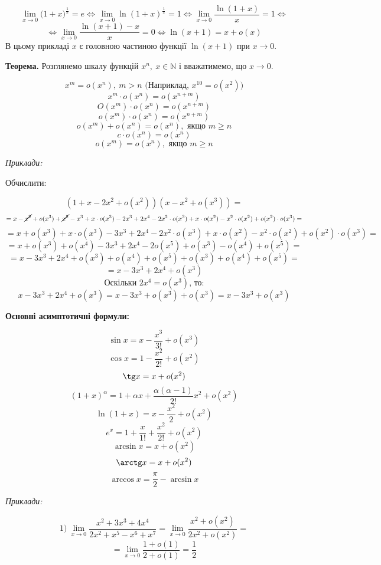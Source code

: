 \documentclass[12pt]{report}
\begin{document}
$$\lim_{x\to 0 }\Big( 1 + x \Big)^{\frac{1}{x}} = e \Longleftrightarrow \lim_{x\to 0} \ln (1 + x)^{\frac{1}{x}} = 1 \Longleftrightarrow \lim_{x\to 0} \frac{\ln (1+x)}{x} = 1 \Longleftrightarrow $$ 
$$\Longleftrightarrow \lim_{x \to 0} \frac{\ln(x+1) - x}{x} = 0 \Longleftrightarrow \ln(x+1) = x + o(x)$$
В цьому прикладі $x$ є головною частиною функції $\ln(x+1)$ при $x \to 0$.

\vspace{5mm}

\textbf{Теорема.} Розглянемо шкалу функцій $x^n, \ x \in \mathbb{N}$ і вважатимемо, що $x \to 0$.

$$x^m = o(x^n), \ m > n \textrm{ (Наприклад, $x^{10} = o(x^2)$)}$$
$$x^m \cdot o(x^n) = o(x^{n+m})$$
$$O(x^m)\cdot o(x^n) = o(x^{n+m})$$
$$o(x^m)\cdot o(x^n) = o(x^{n+m})$$
$$o(x^m) + o(x^n) = o(x^n), \textrm{ якщо $m \geq n$}$$
$$c\cdot o(x^n) = o(x^n)$$
$$o(x^m) = o(x^n), \textrm{ якщо $m \geq n$}$$

\textit{Приклади:}

\vspace{3mm}

Обчислити:

$$(1 + x - 2x^2 + o(x^2))(x - x^2 + o(x^3)) = $$
$$=x - \cancel{x^2} + o(x^3) + \cancel{x^2} - x^3 + x \cdot o(x^3) - 2x^3 + 2x^4 - 2x^2\cdot o(x^3) + x\cdot o(x^2) - x^2 \cdot o(x^2) + o(x^2) \cdot o(x^3) = $$
$$=x + o(x^3) + x \cdot o(x^3) - 3x^3 + 2x^4 - 2x^2\cdot o(x^3) + x\cdot o(x^2) - x^2 \cdot o(x^2) + o(x^2) \cdot o(x^3) = $$
$$=x + o(x^3) + o(x^4) - 3x^3 + 2x^4 - 2o(x^5) + o(x^3) - o(x^4) + o(x^5) = $$
$$=x - 3x^3 + 2x^4 + o(x^3) + o(x^4) + o(x^5) + o(x^3) + o(x^4) + o(x^5) = $$
$$=x - 3x^3 + 2x^4 + o(x^3)$$
$$\textrm{Оскільки $2x^4 = o(x^3)$, то:}$$
$$x - 3x^3 + 2x^4 + o(x^3) = x - 3x^3 + o(x^3) + o(x^3) = x - 3x^3 + o(x^3)$$

\textbf{Основні асимптотичні формули:}

$$\sin x = x - \frac{x^3}{3!} + o(x^3)$$
$$\cos x = 1 - \frac{x^2}{2!} + o(x^2)$$
$$\tg x = x + o(x^2)$$
$$(1+x)^{\alpha} = 1 + \alpha x + \frac{\alpha (\alpha - 1)}{2!}x^2 + o(x^2)$$
$$\ln (1 + x) = x - \frac{x^2}{2} + o(x^2)$$
$$e^x = 1 + \frac{x}{1!} + \frac{x^2}{2!} + o(x^2)$$
$$\arcsin x = x + o(x^2)$$
$$\arctg x = x + o(x^2)$$
$$\arccos x = \frac{\pi}{2} - \arcsin x$$

\textit{Приклади:}

$$1)\ \lim_{x\to 0} \frac{x^2 + 3x^3  +4x^4}{2x^2 + x^5 - x^6 + x^7} = \lim_{x\to 0} \frac{x^2 + o(x^2)}{2x^2 + o(x^2)} = $$
$$ = \lim_{x\to 0} \frac{1 + o(1)}{2 + o(1)} = \frac{1}{2}$$
\end{document}
